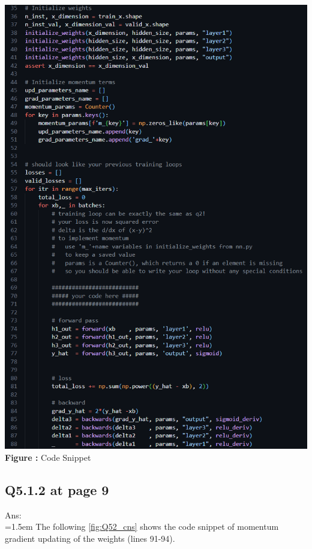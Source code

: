 \documentclass{article}
\begin{document}
	\begin{minipage}{1\linewidth}
		\centering
		\hspace{0.12\linewidth} 
		\includegraphics[width=0.8\linewidth]{./Q51_cns.png}  %
		\newline
		\textbf{Figure \thefigure:} Code Snippet %
		\label{fig:Q51_cns}  %
	\end{minipage} 
	
	\newpage	
	\subsection*{Q5.1.2 at page 9\texttt{}}
	Ans:\\
	\hangindent=1.5em \hspace{1.5em}The following \autoref{fig:Q52_cns} shows the code snippet of momentum gradient updating of the weights (lines 91-94).
	\newline
\end{document}
